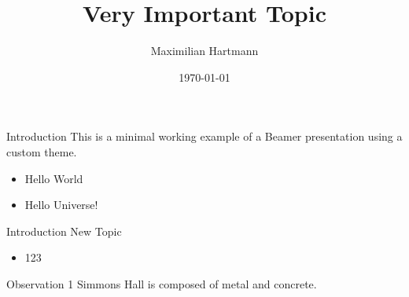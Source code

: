 \documentclass[aspectratio=1610]{beamer}
\title{Very Important Topic}
\author{Maximilian Hartmann}
\date{\today}
\begin{document}
\begin{frame}[plain]
\titlepage
\end{frame}

\begin{frame}{Introduction}
This is a minimal working example of a Beamer presentation using a custom theme.
    \begin{itemize}
        \item Hello World
        \item Hello Universe!
    \end{itemize}
\end{frame}

\begin{frame}{Introduction}
    New Topic
    \begin{itemize}
        \item 123
    \end{itemize}
    \begin{block}{Observation 1}
        Simmons Hall is composed of metal and concrete.
    \end{block}
\end{frame}
\end{document}
